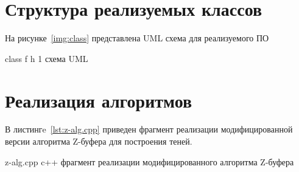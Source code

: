 \section{Структура реализуемых классов}

На рисунке~\ref{img:class} представлена UML схема для реализуемого ПО

{class} %
{f} %
{h} %
{1\textwidth} %
{схема UML} %



\section{Реализация алгоритмов}

В листингe~\ref{lst:z-alg.cpp} приведен фрагмент реализации модифицированной версии алгоритма Z-буфера для построения теней.
	
\newpage
{}
{z-alg.cpp} %
{c++} %
{фрагмент реализации модифицированного алгоритма Z-буфера} %


